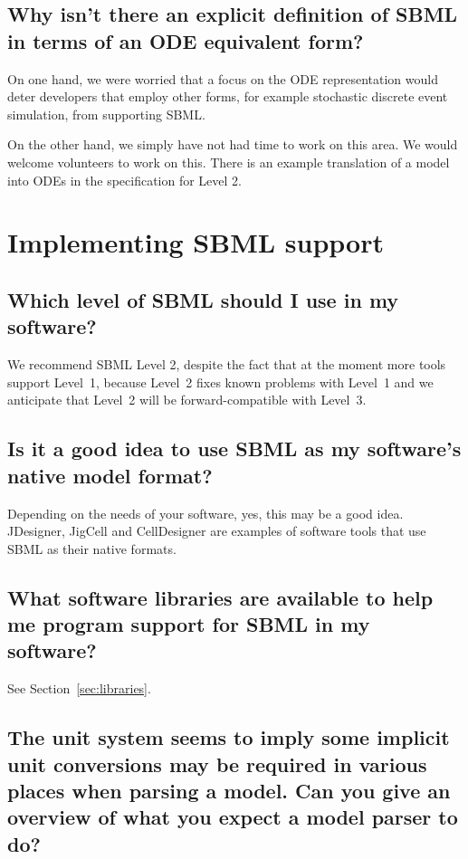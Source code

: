 \documentclass{sbmlfaq}
\begin{document}
\subsection{Why isn't there an explicit definition of SBML in terms of an
  ODE equivalent form?} 

On one hand, we were worried that a focus on the ODE representation would
deter developers that employ other forms, for example stochastic discrete
event simulation, from supporting SBML.

On the other hand, we simply have not had time to work on this area.  We
would welcome volunteers to work on this.  There is an example translation of
a model into ODEs in the specification for Level 2.


\section{Implementing SBML support}

\subsection{Which level of SBML should I use in my software?}

We recommend SBML Level 2, despite the fact that at the moment more tools
support Level~1, because Level~2 fixes known problems with Level~1 and
we anticipate that Level~2 will be forward-compatible with Level~3.


\subsection{Is it a good idea to use SBML as my software's native model format?}

Depending on the needs of your software, yes, this may be a good idea.
JDesigner, JigCell and CellDesigner are examples of software tools that use
SBML as their native formats.


\subsection{What software libraries are available to help me program
  support for SBML in my software?}  

See Section~\ref{sec:libraries}.


\subsection{The unit system seems to imply some implicit unit conversions may be required in various places when parsing a model.
Can you give an overview of what you expect a model parser to do?}
\end{document}
